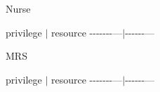 \begin{DoxyEnumerate}
\item Nurse
\end{DoxyEnumerate}

privilege $\vert$ resource -\/-\/-\/-\/-\/-\/-\/---$\vert$-\/-\/-\/-\/-\/-\/---


\begin{DoxyEnumerate}
\item M\-R\-S
\end{DoxyEnumerate}

privilege $\vert$ resource -\/-\/-\/-\/-\/-\/-\/---$\vert$-\/-\/-\/-\/-\/-\/--- 